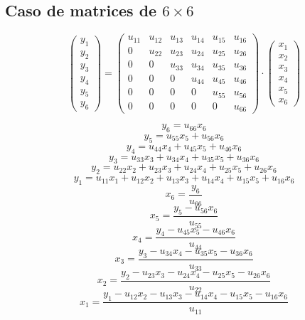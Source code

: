 \documentclass[10pt,a4paper,dvipdfmx]{article}
\begin{document}
\subsection{Caso de matrices de $6\times 6$ }
$$ \left( 
\begin{array}{c}
y_{1} \\
y_{2} \\
y_{3} \\
y_{4} \\
y_{5} \\
y_{6} 
 \end{array}
\right)
 = \left( 
\begin{array}{cccccc}
u_{{1}{1}} & u_{{1}{2}} & u_{{1}{3}} & u_{{1}{4}} & u_{{1}{5}} & u_{{1}{6}} \\
0 & u_{{2}{2}} & u_{{2}{3}} & u_{{2}{4}} & u_{{2}{5}} & u_{{2}{6}} \\
0 & 0 & u_{{3}{3}} & u_{{3}{4}} & u_{{3}{5}} & u_{{3}{6}} \\
0 & 0 & 0 & u_{{4}{4}} & u_{{4}{5}} & u_{{4}{6}} \\
0 & 0 & 0 & 0 & u_{{5}{5}} & u_{{5}{6}} \\
0 & 0 & 0 & 0 & 0 & u_{{6}{6}} 
 \end{array}
\right)
 \cdot \left( 
\begin{array}{c}
x_{1} \\
x_{2} \\
x_{3} \\
x_{4} \\
x_{5} \\
x_{6} 
 \end{array}
\right)
 $$
\begin{multicols}{2}
$$ y_{6} = u_{{6}{6}} x_{6} $$
$$ y_{5} = u_{{5}{5}} x_{5} + u_{{5}{6}} x_{6} $$
$$ y_{4} = u_{{4}{4}} x_{4} + u_{{4}{5}} x_{5} + u_{{4}{6}} x_{6} $$
$$ y_{3} = u_{{3}{3}} x_{3} + u_{{3}{4}} x_{4} + u_{{3}{5}} x_{5} + u_{{3}{6}} x_{6} $$
$$ y_{2} = u_{{2}{2}} x_{2} + u_{{2}{3}} x_{3} + u_{{2}{4}} x_{4} + u_{{2}{5}} x_{5} + u_{{2}{6}} x_{6} $$
$$ y_{1} = u_{{1}{1}} x_{1} + u_{{1}{2}} x_{2} + u_{{1}{3}} x_{3} + u_{{1}{4}} x_{4} + u_{{1}{5}} x_{5} + u_{{1}{6}} x_{6} $$
\vfill\null
\columnbreak
$$ x_{6} = \dfrac{y_{6}}{u_{{6}{6}}} $$
$$ x_{5} = \dfrac{y_{5}- u_{{5}{6}} x_{6}}{u_{{5}{5}}} $$
$$ x_{4} = \dfrac{y_{4}- u_{{4}{5}} x_{5}- u_{{4}{6}} x_{6}}{u_{{4}{4}}} $$
$$ x_{3} = \dfrac{y_{3}- u_{{3}{4}} x_{4}- u_{{3}{5}} x_{5}- u_{{3}{6}} x_{6}}{u_{{3}{3}}} $$
$$ x_{2} = \dfrac{y_{2}- u_{{2}{3}} x_{3}- u_{{2}{4}} x_{4}- u_{{2}{5}} x_{5}- u_{{2}{6}} x_{6}}{u_{{2}{2}}} $$
$$ x_{1} = \dfrac{y_{1}- u_{{1}{2}} x_{2}- u_{{1}{3}} x_{3}- u_{{1}{4}} x_{4}- u_{{1}{5}} x_{5}- u_{{1}{6}} x_{6}}{u_{{1}{1}}} $$
\end{multicols}
\end{document}
